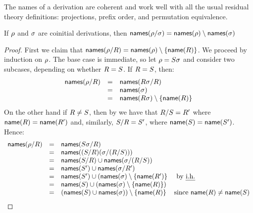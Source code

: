 The names of a derivation are coherent and work well
with all the usual residual theory definitions: projections, prefix order, and permutation
equivalence.

\begin{lemma}
If $\rho$ and $\sigma$ are coinitial derivations, then
$\mathsf{names}(\rho/\sigma) = \mathsf{names}(\rho) \setminus \mathsf{names}(\sigma)$
\end{lemma}
\begin{proof}
First we claim that $\mathsf{names}(\rho/R) = \mathsf{names}(\rho) \setminus \{\mathsf{name}(R)\}$.
We proceed by induction on $\rho$.
The base case is immediate, so let $\rho = S\sigma$
and consider two subcases, depending on whether $R = S$.
If $R = S$,
then:
\[
  \begin{array}{rcl}
  \mathsf{names}(\rho/R) & = & \mathsf{names}(R\sigma/R) \\
                         & = & \mathsf{names}(\sigma) \\
                         & = & \mathsf{names}(R\sigma) \setminus \{\mathsf{name}(R)\} \\
  \end{array}
\]
On the other hand if $R \neq S$,
then by 
we have that $R/S = R'$
where $\mathsf{name}(R) = \mathsf{name}(R')$
and, similarly,
$S/R = S'$,
where $\mathsf{name}(S) = \mathsf{name}(S')$. Hence:
\[
  \begin{array}{rcll}
  \mathsf{names}(\rho/R) & = & \mathsf{names}(S\sigma/R) \\
                         & = & \mathsf{names}((S/R)(\sigma/(R/S))) \\
                         & = & \mathsf{names}(S/R) \cup \mathsf{names}(\sigma/(R/S)) \\
                         & = & \mathsf{names}(S') \cup \mathsf{names}(\sigma/R') \\
                         & = & \mathsf{names}(S') \cup (\mathsf{names}(\sigma) \setminus \{\mathsf{name}(R')\} & \text{ by {\em i.h.}} \\
                         & = & \mathsf{names}(S) \cup (\mathsf{names}(\sigma) \setminus \{\mathsf{name}(R)\}) \\
                         & = & (\mathsf{names}(S) \cup \mathsf{names}(\sigma)) \setminus \{\mathsf{name}(R)\} & \text{since $\mathsf{name}(R) \neq \mathsf{name}(S)$} \\

\end{array}\]
\end{proof}
